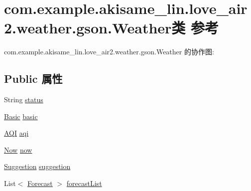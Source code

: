\hypertarget{classcom_1_1example_1_1akisame__lin_1_1love__air2_1_1weather_1_1gson_1_1_weather}{}\section{com.\+example.\+akisame\+\_\+lin.\+love\+\_\+air2.\+weather.\+gson.\+Weather类 参考}
\label{classcom_1_1example_1_1akisame__lin_1_1love__air2_1_1weather_1_1gson_1_1_weather}


com.\+example.\+akisame\+\_\+lin.\+love\+\_\+air2.\+weather.\+gson.\+Weather 的协作图\+:
\subsection*{Public 属性}
\begin{DoxyCompactItemize}
\item 
String \mbox{\hyperlink{classcom_1_1example_1_1akisame__lin_1_1love__air2_1_1weather_1_1gson_1_1_weather_ae3e855b8db60e5914d4d980747f97847}{status}}
\item 
\mbox{\hyperlink{classcom_1_1example_1_1akisame__lin_1_1love__air2_1_1weather_1_1gson_1_1_basic}{Basic}} \mbox{\hyperlink{classcom_1_1example_1_1akisame__lin_1_1love__air2_1_1weather_1_1gson_1_1_weather_ae1d530e1d955d69c3482b897634ca2aa}{basic}}
\item 
\mbox{\hyperlink{classcom_1_1example_1_1akisame__lin_1_1love__air2_1_1weather_1_1gson_1_1_a_q_i}{A\+QI}} \mbox{\hyperlink{classcom_1_1example_1_1akisame__lin_1_1love__air2_1_1weather_1_1gson_1_1_weather_a774b73b539dad15b44e837011c226bc1}{aqi}}
\item 
\mbox{\hyperlink{classcom_1_1example_1_1akisame__lin_1_1love__air2_1_1weather_1_1gson_1_1_now}{Now}} \mbox{\hyperlink{classcom_1_1example_1_1akisame__lin_1_1love__air2_1_1weather_1_1gson_1_1_weather_a8d92e5492678a858acd697d83968e8be}{now}}
\item 
\mbox{\hyperlink{classcom_1_1example_1_1akisame__lin_1_1love__air2_1_1weather_1_1gson_1_1_suggestion}{Suggestion}} \mbox{\hyperlink{classcom_1_1example_1_1akisame__lin_1_1love__air2_1_1weather_1_1gson_1_1_weather_ac8458ca98b04014819e46e2d965c8cd5}{suggestion}}
\item 
List$<$ \mbox{\hyperlink{classcom_1_1example_1_1akisame__lin_1_1love__air2_1_1weather_1_1gson_1_1_forecast}{Forecast}} $>$ \mbox{\hyperlink{classcom_1_1example_1_1akisame__lin_1_1love__air2_1_1weather_1_1gson_1_1_weather_a62cab89aed164869ac56e7b1967eafd7}{forecast\+List}}
\end{DoxyCompactItemize}


